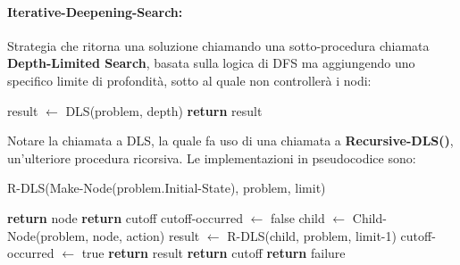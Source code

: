 \paragraph{Iterative-Deepening-Search:} Strategia che ritorna una soluzione chiamando una sotto-procedura chiamata \textbf{Depth-Limited Search}, basata
sulla logica di DFS ma aggiungendo uno specifico limite di profondità, sotto al quale non controllerà i nodi: \begin{algorithm}[h]
    \caption{IDS(problem) \textbf{returns} solution}
    \begin{algorithmic}[i]
            \State result $\gets$ DLS(problem, depth)
             \textbf{return} result
            \EndIf
        \EndFor
    \end{algorithmic}
\end{algorithm}

\noindent Notare la chiamata a DLS, la quale fa uso di una chiamata a \textbf{Recursive-DLS()}, un'ulteriore procedura ricorsiva. Le implementazioni in
pseudocodice sono: \begin{algorithm}[h]
    \caption{DLS(problem, limit) \textbf{returns} solution, failure or cutoff}
    \begin{algorithmic}[i]
        \State R-DLS(Make-Node(problem.Initial-State), problem, limit)
    \end{algorithmic}
\end{algorithm}

\begin{algorithm}[h]
    \caption{R-DLS(node, problem, limit) \textbf{returns} solution, failure or cutoff}
    \begin{algorithmic}[i]
         \textbf{return} node
         \textbf{return} cutoff
        \Else
            \State cutoff-occurred $\gets$ false
                \State child $\gets$ Child-Node(problem, node, action)
                \State result $\gets$ R-DLS(child, problem, limit-1)
                 cutoff-occurred $\gets$ true
                 \textbf{return} result
                \EndIf
            \EndFor
             \textbf{return} cutoff
            \Else \textbf{ return} failure
            \EndIf
        \EndIf
    \end{algorithmic}
\end{algorithm}

